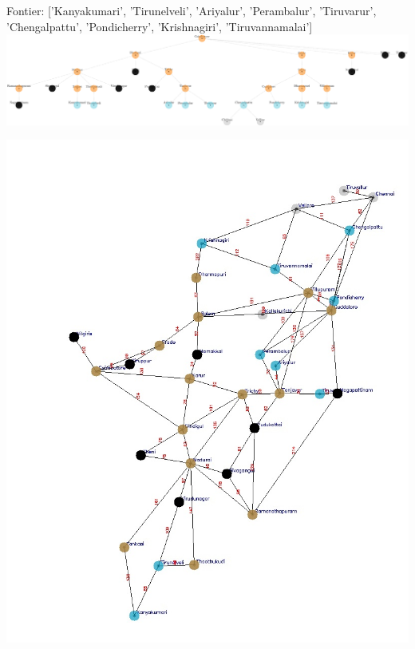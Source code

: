 \documentclass[xcolor=table]{beamer}
\begin{document}
\begin{frame}
  { \tiny Fontier: ['Kanyakumari', 'Tirunelveli', 'Ariyalur', 'Perambalur', 'Tiruvarur', 'Chengalpattu', 'Pondicherry', 'Krishnagiri', 'Tiruvannamalai']}
  \includegraphics[width=1\textwidth]{../BFSNodes/32-1.png}
  \begin{center}
    \includegraphics[height=0.55\textheight]{../BFSoutput/tamilBFS30.jpg}
  \end{center}
\end{frame}
\end{document}
